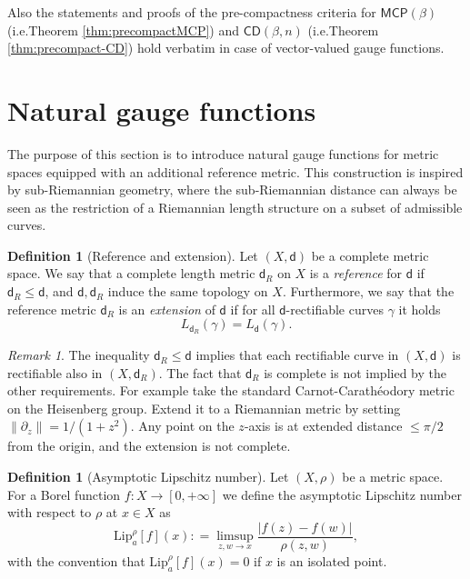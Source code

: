 \documentclass[11pt,a4paper]{article}
\theoremstyle{plain}
\theoremstyle{definition}
\newtheorem{definition}[theorem]{Definition}
\theoremstyle{remark}
\newtheorem{remark}[theorem]{Remark}
\numberwithin{equation}{section}
\newcommand{\CD}{\mathsf{CD}}
\newcommand{\MCP}{\mathsf{MCP}}
\newcommand{\sfd}{\mathsf d}
\begin{document}
Also the statements and proofs of the pre-compactness criteria for $\MCP(\beta)$ (i.e.\@ Theorem \ref{thm:precompactMCP}) and $\CD(\beta,n)$ (i.e.\@ Theorem \ref{thm:precompact-CD}) hold verbatim in case of vector-valued gauge functions. 
 

\section{Natural gauge functions}\label{sec:nonsmooth}

The purpose of this section is to introduce natural gauge functions for metric spaces equipped with an additional reference metric. This construction is inspired by sub-Riemannian geometry, where the sub-Riemannian distance can always be seen as the restriction of a Riemannian length structure on a subset of admissible curves.

\begin{definition}[Reference and extension]\label{def:extension}
Let $(X,\sfd)$ be a complete metric space. We say that a complete length metric $\sfd_R$ on $X$ is a \emph{reference} for $\sfd$ if $\sfd_R\leq \sfd$, and $\sfd,\sfd_R$ induce the same topology on $X$. Furthermore, we say that the reference metric $\sfd_R$ is an \emph{extension} of $\sfd$ if for all $\sfd$-rectifiable curves $\gamma$ it holds
\begin{equation}\label{eq:extension}
L_{\sfd_R}(\gamma) = L_{\sfd}(\gamma).
\end{equation}
\end{definition}
\begin{remark}
The inequality $\sfd_R\leq \sfd$ implies that each rectifiable curve in  $(X,\sfd)$ is rectifiable also in  $(X,\sfd_R)$. The fact that $\sfd_R$ is complete is not implied by the other requirements. For example take the standard Carnot-Carathéodory metric on the Heisenberg group. Extend it to a Riemannian metric by setting $\|\partial_z\| = 1/(1+z^2)$. Any point on the $z$-axis is at extended distance $\leq \pi/2$ from the origin, and the extension is not complete.
\end{remark}

\begin{definition}[Asymptotic Lipschitz number]\label{def:asLipnumb}
Let $(X,\rho)$ be a metric space. For a Borel function $f: X \to [0,+\infty]$ we define the asymptotic Lipschitz number with respect to $\rho$ at $x\in X$ as
\begin{equation}
\mathrm{Lip}_a^{\rho} [f](x): =\limsup_{z,w\to x} \frac{|f(z)-f(w)|}{\rho(z,w)},
\end{equation}
with the convention that $\mathrm{Lip}_a^{\rho} [f](x) = 0$ if $x$ is an isolated point.
\end{definition}
\end{document}
